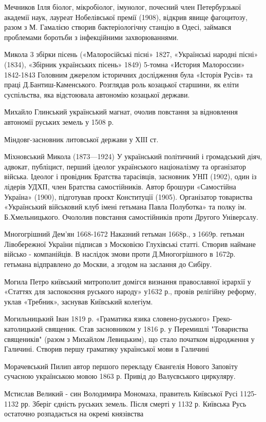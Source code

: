 Мечников Ілля біолог, мікробіолог, імунолог, почесний член Петербурзької академії наук, лауреат Нобелівської премії (1908), відкрив явище фагоцитозу, разом з М. Гамалією створив бактеріологічну станцію в Одесі, займався проблемами боротьби з інфекційними захворюваннями. 

Микола 3 збірки пісень («Малоросійські пісні» 1827, «Українські народні пісні» (1834), «Збірник українських пісень» 1849) 5-томна «История Малороссии» 1842-1843 Головним джерелом історичних дослідження була «Історія Русів» та праці Д.Бантиш-Каменського. Розглядав роль козацької старшини, як еліти суспільства, яка відстоювала автономію козацької держави.

Михайло Глинський український магнат, очолив повстання за відновлення автономії руських земель у 1508 р.

Міндовг-засновник литовської держави у ХІІІ ст.

Міхновський Микола (1873—1924) У український політичний і громадський діяч, адвокат, публіцист, перший ідеолог українського націоналізму та організатор війська. Ідеолог і провідник Братства тарасівців, засновник УНП (1902), один із лідерів УДХП, член Братства самостійників. Автор брошури «Самостійна Україна» (1900), підготував проєкт Конституції (1905). Організатор товариства «Український військовий клуб імені гетьмана Павла Полуботка» та полку ім. Б.Хмельницького. Очололив повстання самостійників проти Другого Універсалу. 

Многогрішний Дем’ян  1668-1672 Наказний гетьман 1668р., з 1669р. гетьман Лівобережної України підписав з Московією Глухівські статті. Створив наймане військо - компанійців. В наслідок змови проти Д.Многогрішного в 1672р. гетьмана відправлено до Москви, а згодом на заслання до Сибіру.

Могила  Петро київський митрополит домігся визнання православної ієрархії у «Статтях для заспокоєння руського народу» у1632 р., провів релігійну реформу, уклав «Требник», заснував Київський колегіум.

Могильницький Іван 1819 р. «Граматика язика словено-руського» Греко-католицький священик. Став засновником у 1816 р. у Перемишлі "Товариства священиків" (разом з Михайлом Левицьким), що стало початком відродження у Галичині. Створив першу граматику української мови в Галичині

Морачевський Пилип автор першого перекладу  Євангелія Нового Заповіту сучасною українською мовою 1863 р. Привід до Валуєвського циркуляру.

Мстислав Великий - син Володимира Мономаха, правитель Київської Русі 1125-1132 рр. Зберіг єдність руських земель. Після смерті у 1132 р. Київська Русь остаточно розпадається на окремі князівства

